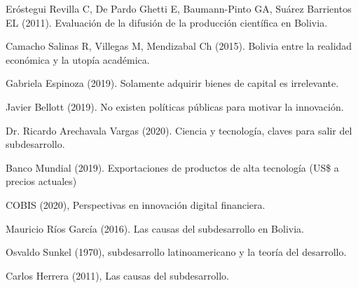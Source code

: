 \documentclass[10pt]{book}
\begin{document}
\begin{thebibliography}{10}


     Eróstegui Revilla C, De Pardo Ghetti E, Baumann-Pinto GA, Suárez Barrientos EL (2011). Evaluación de la difusión de la producción científica en Bolivia. 

     Camacho Salinas R, Villegas M, Mendizabal Ch (2015). Bolivia entre la realidad económica y la utopía académica.

     Gabriela Espinoza (2019). Solamente adquirir bienes de capital es irrelevante. 

     Javier Bellott (2019). No existen políticas públicas para motivar la innovación.

     Dr. Ricardo Arechavala Vargas (2020). Ciencia y tecnología, claves para salir del subdesarrollo.

     Banco Mundial (2019). Exportaciones de productos de alta tecnología (US\$ a precios actuales)

     COBIS (2020), Perspectivas en innovación digital financiera.




    \bibitem{}  Mauricio Ríos García (2016). Las causas del subdesarrollo en Bolivia.

    \bibitem{}  Osvaldo Sunkel (1970), subdesarrollo latinoamericano y la teoría del desarrollo.

    \bibitem{}	Carlos Herrera (2011), Las causas del subdesarrollo. 

\end{thebibliography}
\end{document}
